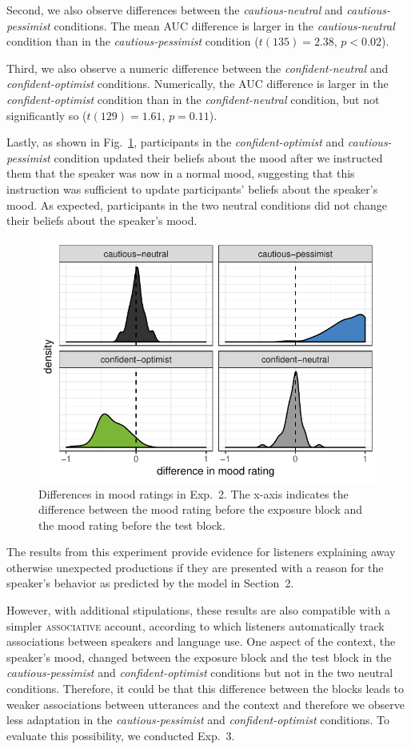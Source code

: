 \documentclass[man,floatsintext]{apa6}
\begin{document}
Second, we also observe differences between the \textit{cautious-neutral} and \textit{cautious-pessimist} conditions. The mean AUC difference is larger in the \textit{cautious-neutral} condition than in the \textit{cautious-pessimist} condition  ($t(135)=2.38$, $p < 0.02$).

Third, we also observe a numeric difference between the \textit{confident-neutral} and \textit{confident-optimist} conditions. Numerically, the AUC difference is larger in the \textit{confident-optimist} condition than in the \textit{confident-neutral} condition, but not significantly so ($t(129) =1.61$, $p = 0.11$).

Lastly, as shown in Fig.~\ref{fig:manip-check-exp2}, participants in the \textit{confident-optimist} and \textit{cautious-pessimist} condition updated their beliefs about the mood after we instructed them that the speaker was now in a normal mood, suggesting that this instruction was sufficient to update participants' beliefs about the speaker's mood. As expected, participants in the two neutral conditions did not change their beliefs about the speaker's mood. 

\begin{figure}[t]
\center
    \includegraphics[width=.5\columnwidth]{mood-differences-exp2.pdf}
    \caption{Differences in mood ratings in Exp.~2. The x-axis indicates the difference between the mood rating before the exposure block and the mood rating before the test block.}
    \label{fig:manip-check-exp2}
\end{figure}


The results from this experiment provide evidence for listeners explaining away otherwise unexpected productions if they are presented with a reason for the speaker's behavior as predicted by the model in Section~2. 

However, with additional stipulations, these results are also compatible with a simpler \textsc{associative} account, according to which listeners automatically track associations between speakers and language use. One aspect of the context, the speaker's mood, changed between the exposure block and the test block in the \textit{cautious-pessimist} and \textit{confident-optimist} conditions but not in the two neutral conditions. Therefore, it could be that this difference between the blocks leads to weaker associations between utterances and the context and therefore we observe less adaptation in the \textit{cautious-pessimist} and \textit{confident-optimist} conditions. To evaluate this possibility, we conducted Exp.~3.
\end{document}
